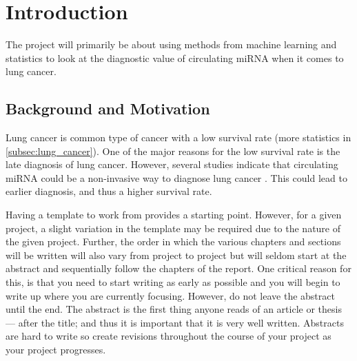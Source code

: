 \chapter{Introduction}
\label{cha:Introduction}

\iffalse
All chapters should begin with an introduction before any sections begin. Further, each sections begins with an introduction before  subsections begin. Chapters with just one section or sections with just one sub-section, should be avoided. Think carefully about chapter and section titles as each title stand alone in the table of contents (without associated text) and should convey meaning for the contents of the chapter or section. 

In all chapters and sections it is important to write clearly and concisely. Avoid repetitions and if needed, refer back to the original discussion or presentation. Each new section, subsection or paragraph should provide the reader with new information and be written in your own words. Avoid direct quotes. If you use direct quotes, unless the quote itself is very significant, you are conveying to the reader that you are unable to express this discussion or fact yourself. Such direct quotes also break the flow of the language (yours to someone else's).
\fi
The project will primarily be about using methods from machine learning and statistics to look at the diagnostic value of circulating miRNA when it comes to lung cancer.

\section{Background and Motivation}\label{cit}
\label{sec:BackgroundAndMotivation}

Lung cancer is common type of cancer with a low survival rate (more statistics in \ref{subsec:lung_cancer}). One of the major reasons for the low survival rate is the late diagnosis of lung cancer. However, several studies indicate that circulating miRNA could be a non-invasive way to diagnose lung cancer \citep{circmeta}. This could lead to earlier diagnosis, and thus a higher survival rate.

\iffalse
Having a template to work from provides a starting point. However, for a given project, a slight variation in the template may be required due to the nature of the given project. Further, the order in which the various chapters and sections will be written will also vary from project to project but will seldom start at the abstract and sequentially follow the chapters of the report. One critical reason for this, is that you need to start writing as early as possible and you will begin to write up where you are currently focusing. However, do not leave the abstract until the end. The abstract is the first thing anyone reads of an article or thesis --- after the title; and thus it is important that it is very well written. Abstracts are hard to write so create revisions throughout the course of your project as your project progresses.  

